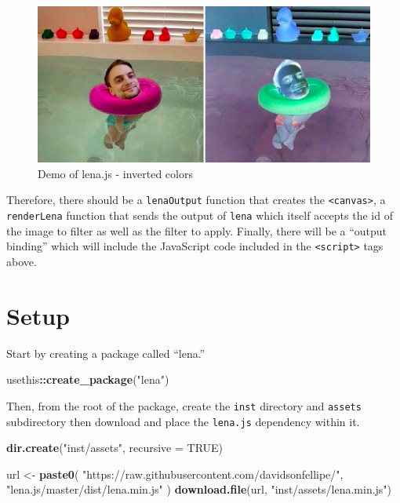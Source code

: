 \documentclass[
]{krantz}
\makeatletter
\newenvironment{Shaded}{\begin{snugshade}}{\end{snugshade}}
\newcommand{\DataTypeTok}[1]{\textcolor[rgb]{0.27,0.27,0.27}{#1}}
\newcommand{\KeywordTok}[1]{\textcolor[rgb]{0.27,0.27,0.27}{\textbf{#1}}}
\newcommand{\NormalTok}[1]{#1}
\newcommand{\OperatorTok}[1]{\textcolor[rgb]{0.43,0.43,0.43}{\textbf{#1}}}
\newcommand{\OtherTok}[1]{\textcolor[rgb]{0.37,0.37,0.37}{#1}}
\newcommand{\StringTok}[1]{\textcolor[rgb]{0.5,0.5,0.5}{#1}}
\newenvironment{kframe}{%
\medskip{}
\setlength{\fboxsep}{.8em}
 \def\at@end@of@kframe{}%
 \ifinner\ifhmode%
  \def\at@end@of@kframe{\end{minipage}}%
  \begin{minipage}{\columnwidth}%
 \fi\fi%
 \def\FrameCommand##1{\hskip\@totalleftmargin \hskip-\fboxsep
 \colorbox{shadecolor}{##1}\hskip-\fboxsep
     \hskip-\linewidth \hskip-\@totalleftmargin \hskip\columnwidth}%
 \MakeFramed {\advance\hsize-\width
   \@totalleftmargin\z@ \linewidth\hsize
   \@setminipage}}%
 {\par\unskip\endMakeFramed%
 \at@end@of@kframe}
\renewenvironment{Shaded}{\begin{kframe}}{\end{kframe}}
\makeatother
\begin{document}
\begin{figure}
\centering
\includegraphics{images/lena-demo.png}
\caption{Demo of lena.js - inverted colors}
\end{figure}

Therefore, there should be a \texttt{lenaOutput} function that creates the \texttt{\textless{}canvas\textgreater{}}, a \texttt{renderLena} function that sends the output of \texttt{lena} which itself accepts the id of the image to filter as well as the filter to apply. Finally, there will be a ``output binding'' which will include the JavaScript code included in the \texttt{\textless{}script\textgreater{}} tags above.

\hypertarget{setup}{%
\section*{Setup}\label{setup}}


Start by creating a package called ``lena.''

\begin{Shaded}
\begin{Highlighting}[]
\NormalTok{usethis}\OperatorTok{::}\KeywordTok{create\_package}\NormalTok{(}\StringTok{"lena"}\NormalTok{)}
\end{Highlighting}
\end{Shaded}

Then, from the root of the package, create the \texttt{inst} directory and \texttt{assets} subdirectory then download and place the \texttt{lena.js} dependency within it.

\begin{Shaded}
\begin{Highlighting}[]
\KeywordTok{dir.create}\NormalTok{(}\StringTok{"inst/assets"}\NormalTok{, }\DataTypeTok{recursive =} \OtherTok{TRUE}\NormalTok{)}

\NormalTok{url \textless{}{-}}\StringTok{ }\KeywordTok{paste0}\NormalTok{(}
  \StringTok{"https://raw.githubusercontent.com/davidsonfellipe/"}\NormalTok{,}
  \StringTok{"lena.js/master/dist/lena.min.js"}
\NormalTok{)}
\KeywordTok{download.file}\NormalTok{(url, }\StringTok{"inst/assets/lena.min.js"}\NormalTok{)}
\end{Highlighting}
\end{Shaded}
\end{document}
